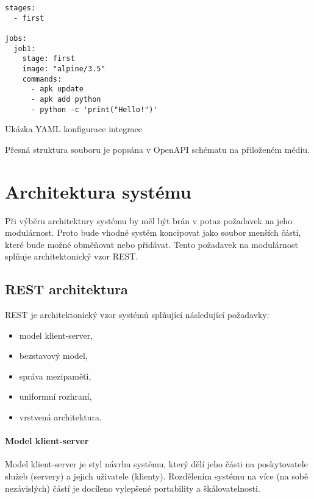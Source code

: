 
\begin{listing}[ht]
\begin{verbatim}
stages:
  - first

jobs:
  job1:
    stage: first
    image: "alpine/3.5"
    commands:
      - apk update
      - apk add python
      - python -c 'print("Hello!")'
\end{verbatim}
\caption{Ukázka YAML konfigurace integrace}
\label{listing:yaml}
\end{listing}

Přesná struktura souboru je popsána v OpenAPI schématu na přiloženém médiu.

\section{Architektura systému}

Při výběru architektury systému by měl být brán v potaz požadavek na jeho modulárnost.
Proto bude vhodné systém koncipovat jako soubor menších části, které bude možné obměňovat nebo přidávat.
Tento požadavek na modulárnost splňuje architektonický vzor REST.

\subsection{REST architektura}

REST je architektonický vzor systémů splňující následující požadavky:

\begin{itemize}
    \item model klient-server,
    \item bezstavový model,
    \item správa mezipaměťi,
    \item uniformní rozhraní,
    \item vrstvená architektura. \cite{rest}
\end{itemize}

\paragraph{Model klient-server}

Model klient-server je styl návrhu systému, který dělí jeho části na poskytovatele služeb (servery) a jejich uživatele (klienty).
Rozdělením systému na více (na sobě nezávislých) částí je docíleno vylepšené portability a škálovatelnosti.

